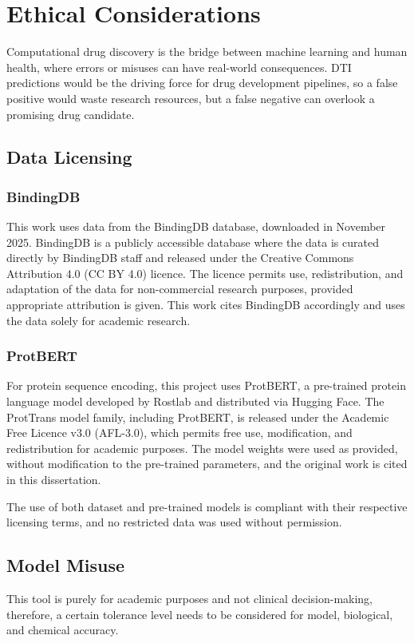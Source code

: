 \chapter{Ethical Considerations}
Computational drug discovery is the bridge between machine learning and human health, where errors or misuses can have real-world consequences.
DTI predictions would be the driving force for drug development pipelines, so a false positive would waste research resources, but a false negative can overlook a promising drug candidate.


\section{Data Licensing}
\subsection{BindingDB}
This work uses data from the BindingDB database, downloaded in November 2025.
BindingDB is a publicly accessible database where the data is curated directly by BindingDB staff and released under the Creative Commons Attribution 4.0 (CC BY 4.0) licence.
The licence permits use, redistribution, and adaptation of the data for non-commercial research purposes, provided appropriate attribution is given.
This work cites BindingDB accordingly and uses the data solely for academic research.
\subsection{ProtBERT}
For protein sequence encoding, this project uses ProtBERT, a pre-trained protein language model developed by Rostlab and distributed via Hugging Face.
The ProtTrans model family, including ProtBERT, is released under the Academic Free Licence v3.0 (AFL-3.0), which permits free use, modification, and redistribution for academic purposes.
The model weights were used as provided, without modification to the pre-trained parameters, and the original work is cited in this dissertation.

The use of both dataset and pre-trained models is compliant with their respective licensing terms, and no restricted data was used without permission.
\section{Model Misuse}
This tool is purely for academic purposes and not clinical decision-making, therefore, a certain tolerance level needs to be considered for model, biological, and chemical accuracy.

